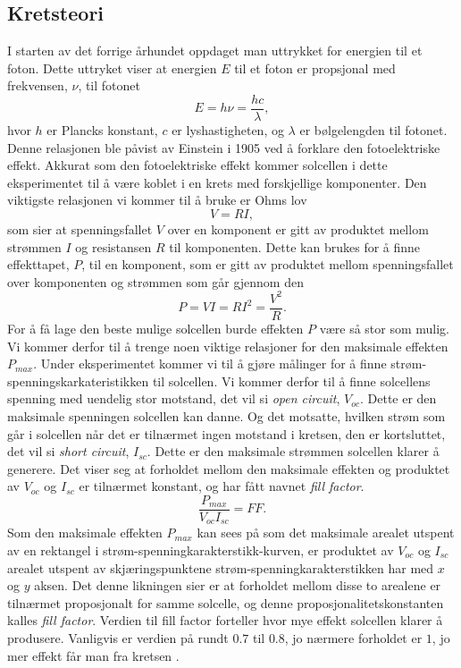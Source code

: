 \documentclass[%
 reprint,
 amsmath,amssymb,
 aps,
 norsk,
 booktabs
]{revtex4-1}
\begin{document}
\subsection{Kretsteori}
I starten av det forrige århundet oppdaget man uttrykket for energien til et foton. Dette uttryket viser at energien $E$ til et foton er propsjonal med frekvensen, $\nu$, til fotonet
\begin{equation}
  E = h\nu = \frac{hc}{\lambda} \label{einstein},
\end{equation}hvor $h$ er Plancks konstant, $c$ er lyshastigheten, og $\lambda$ er bølgelengden til fotonet. Denne relasjonen ble påvist av Einstein i 1905 ved å forklare den fotoelektriske effekt. Akkurat som den fotoelektriske effekt kommer solcellen i dette eksperimentet til å være koblet i en krets med forskjellige komponenter. Den viktigste relasjonen vi kommer til å bruke er Ohms lov
\begin{equation}
  V = RI, \label{ohm}
\end{equation}som sier at spenningsfallet $V$ over en komponent er gitt av produktet mellom strømmen $I$ og resistansen $R$ til komponenten. Dette kan brukes for å finne effekttapet, $P$, til en komponent, som er gitt av produktet mellom spenningsfallet over komponenten og strømmen som går gjennom den
\begin{equation}
  P = VI = RI^2 = \frac{V^2}{R} \label{effekt1}.
\end{equation}For å få lage den beste mulige solcellen burde effekten $P$ være så stor som mulig. Vi kommer derfor til å trenge noen viktige relasjoner for den maksimale effekten $P_{max}$. Under eksperimentet kommer vi til å gjøre målinger for å finne strøm-spenningskarkateristikken til solcellen. Vi kommer derfor til å finne solcellens spenning med uendelig stor motstand, det vil si \textit{open circuit}, $V_{oc}$. Dette er den maksimale spenningen solcellen kan danne. Og det motsatte, hvilken strøm som går i solcellen når det er tilnærmet ingen motstand i kretsen, den er kortsluttet, det vil si \textit{short circuit}, $I_{sc}$. Dette er den maksimale strømmen solcellen klarer å generere. Det viser seg at forholdet mellom den maksimale effekten og produktet av $V_{oc}$ og $I_{sc}$ er tilnærmet konstant, og har fått navnet \textit{fill factor}.
\begin{equation}
  \frac{P_{max}}{V_{oc}I_{sc}} = FF. \label{ff}
\end{equation}
Som den maksimale effekten $P_{max}$ kan sees på som det maksimale arealet utspent av en rektangel i strøm-spenningkarakterstikk-kurven, er produktet av $V_{oc}$ og $I_{sc}$ arealet utspent av skjæringspunktene strøm-spenningkarakterstikken har med $x$ og $y$ aksen. Det denne likningen sier er at forholdet mellom disse to arealene er tilnærmet proposjonalt for samme solcelle, og denne proposjonalitetskonstanten kalles \textit{fill factor}. Verdien til fill factor forteller hvor mye effekt solcellen klarer å produsere. Vanligvis er verdien på rundt $0.7$ til $0.8$, jo nærmere forholdet er $1$, jo mer effekt får man fra kretsen \cite{energy_alt}.\\
\end{document}
